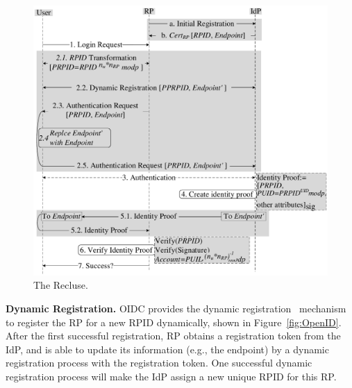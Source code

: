 \begin{figure}
  \centering
  \includegraphics[width=\linewidth]{fig/overview1.pdf}
  \caption{The Recluse.}
  \label{fig:Recluse}
\end{figure}

\noindent\textbf{Dynamic Registration.} OIDC provides the dynamic registration~\cite{DynamicRegistration} mechanism to register the RP for a new RPID dynamically, shown in Figure~\ref{fig:OpenID}. After the first successful registration, RP obtains a registration token from the IdP, and is able to update its information (e.g., the endpoint) by a dynamic registration process with the  registration token. One successful dynamic registration process will make the IdP assign a new unique RPID for this RP.



